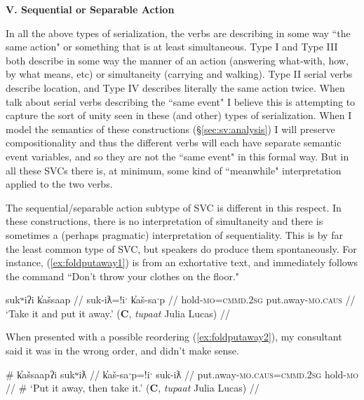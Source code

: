 \noindent \textbf{V. Sequential or Separable Action}

\vspace{10pt}

In all the above types of serialization, the verbs are describing in some way ``the same action" or something that is at least simultaneous. Type I and Type III both describe in some way the manner of an action (answering what-with, how, by what means, etc) or simultaneity (carrying and walking). Type II serial verbs describe location, and Type IV describes literally the same action twice. When \cite{aikhenvalddixon2006} talk about serial verbs describing the ``same event" I believe this is attempting to capture the sort of unity seen in these (and other) types of serialization. When I model the semantics of these constructions (\S\ref{sec:sv:analysis}) I will preserve compositionality and thus the different verbs will each have separate semantic event variables, and so they are not the ``same event" in this formal way. But in all these SVCs there is, at minimum, some kind of ``meanwhile" interpretation applied to the two verbs.

The sequential/separable action subtype of SVC is different in this respect. In these constructions, there is no interpretation of simultaneity and there is sometimes a (perhaps pragmatic) interpretation of sequentiality. This is by far the least common type of SVC, but speakers do produce them spontaneously. For instance, (\ref{ex:foldputaway1}) is from an exhortative text, and immediately follows the command ``Don't throw your clothes on the floor."

\ex \label{ex:foldputaway1}
\begingl
\glpreamble sukʷiʔi k̓ašsaap //
\gla suk-iƛ=!iˑ k̓aš-saˑp //
\glb hold-\textsc{mo}=\textsc{cmmd.2sg} put.away-\textsc{mo.caus} //
\glft `Take it and put it away.' (\textbf{C}, \textit{tupaat} Julia Lucas) //
\endgl
\xe

When presented with a possible reordering (\ref{ex:foldputaway2}), my consultant said it was in the wrong order, and didn't make sense.

\ex \label{ex:foldputaway2}
\begingl
\glpreamble \# k̓ašsaapʔi sukʷiƛ //
\gla k̓aš-saˑp=!iˑ suk-iƛ //
\glb put.away-\textsc{mo.caus}=\textsc{cmmd.2sg} hold-\textsc{mo} //
\glft \# `Put it away, then take it.' (\textbf{C}, \textit{tupaat} Julia Lucas) //
\endgl
\xe

